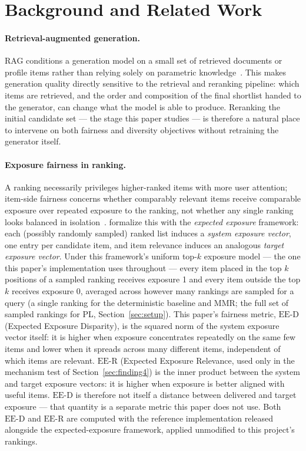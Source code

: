 \documentclass[11pt]{article}
\newcommand{\eed}{\ensuremath{\mathrm{EE\text{-}D}}}
\newcommand{\eer}{\ensuremath{\mathrm{EE\text{-}R}}}
\begin{document}
\section{Background and Related Work}

\paragraph{Retrieval-augmented generation.} RAG conditions a generation
model on a small set of retrieved documents or profile items rather than
relying solely on parametric knowledge~\citep{lewis2020rag}. This makes
generation quality directly sensitive to the retrieval and reranking
pipeline: which items are retrieved, and the order and composition of the
final shortlist handed to the generator, can change what the model is
able to produce. Reranking the initial candidate set --- the stage this
paper studies --- is therefore a natural place to intervene on both
fairness and diversity objectives without retraining the generator itself.

\paragraph{Exposure fairness in ranking.} A ranking necessarily privileges
higher-ranked items with more user attention; item-side fairness concerns
whether comparably relevant items receive comparable exposure over
repeated exposure to the ranking, not whether any single ranking looks
balanced in isolation~\citep{singh2018fairness,biega2018equity}.
\citet{diaz2020expectedexposure} formalize this with the \emph{expected
exposure} framework: each (possibly randomly sampled) ranked list induces
a \emph{system exposure vector}, one entry per candidate item, and item
relevance induces an analogous \emph{target exposure vector}. Under this
framework's uniform top-$k$ exposure model --- the one this paper's
implementation uses throughout --- every item placed in the top $k$
positions of a sampled ranking receives exposure 1 and every item outside
the top $k$ receives exposure 0, averaged across however many rankings are
sampled for a query (a single ranking for the deterministic baseline and
MMR; the full set of sampled rankings for PL, Section~\ref{sec:setup}).
This paper's fairness metric, \eed{} (Expected Exposure Disparity), is the
squared norm of the system exposure vector itself: it is higher when
exposure concentrates repeatedly on the same few items and lower when it
spreads across many different items, independent of which items are
relevant. \eer{} (Expected Exposure Relevance, used only in the mechanism
test of Section~\ref{sec:finding4}) is the inner product between the
system and target exposure vectors: it is higher when exposure is better
aligned with useful items. \eed{} is therefore not itself a distance
between delivered and target exposure --- that quantity is a separate
metric this paper does not use. Both \eed{} and \eer{} are computed with
the reference implementation released alongside the expected-exposure
framework, applied unmodified to this project's rankings.
\end{document}
